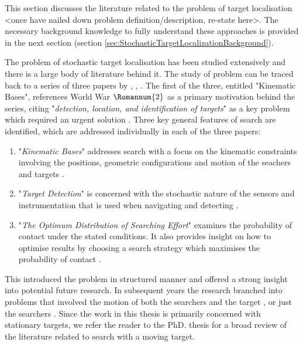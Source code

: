 


This section discusses the literature related to the problem of target localisation <once have nailed down problem definition/description, re-state here>. The necessary background knowledge to fully understand these approaches is provided in the next section (section \ref{sec:StochasticTargetLocalizationBackground}).


The problem of stochastic target localisation has been studied extensively and there is a large body of literature behind it. The study of problem can be traced back to a series of three papers by \citeauthor{KoopmanTheoryOfSearchTargetDetection} \cite{Koopman1956THEBASES}, \cite{KoopmanTheoryOfSearchTargetDetection}, \cite{Koopman1957TheEffort}. The first of the three, entitled "Kinematic Bases", references World War $\Romannum{2}$ as a primary motivation behind the series, citing "\textit{detection, location, and identification of targets}" as a key problem which required an urgent solution \cite{Koopman1956THEBASES}. Three key general features of search are identified, which are addressed individually in each of the three papers:
\begin{enumerate}
    \item "\textit{Kinematic Bases}" addresses search with a focus on the kinematic constraints involving the positions, geometric configurations and motion of the seachers and targets \cite{Koopman1956THEBASES}.

    \item "\textit{Target Detection}" is concerned with the stochastic nature of the sensors and instrumentation that is used when navigating and detecting \cite{KoopmanTheoryOfSearchTargetDetection}.
 
    \item "\textit{The Optimum Distribution of Searching Effort}" examines the probability of contact under the stated conditions. It also provides insight on how to optimise results by choosing a search strategy which maximises the probability of contact \cite{Koopman1957TheEffort}.
\end{enumerate}
This introduced the problem in structured manner and offered a strong insight into potential future research. In subsequent years the research branched into problems that involved the motion of both the searchers and the target \cite{Stone1980OptimalTargets}, or just the searchers \cite{Chew1966AProcedure}. Since the work in this thesis is primarily concerned with stationary targets, we refer the reader to the PhD. thesis \cite{Lau2007OptimalEnvironments} for a broad review of the literature related to search with a moving target. 


